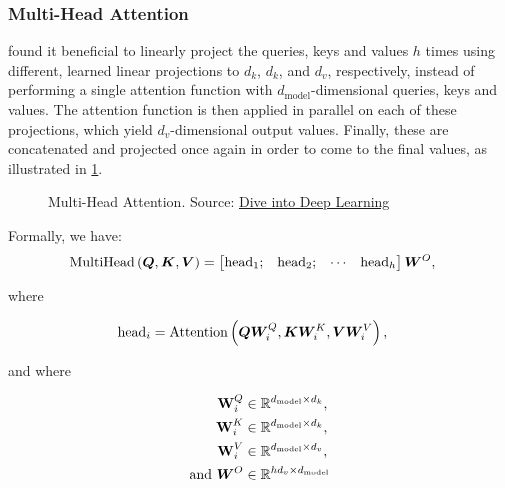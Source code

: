 \subsubsection{Multi-Head Attention}
\label{subsubsec:multi_head_attention}

\citet{vaswani2017attention} found it beneficial to linearly project the queries, keys and values $h$ times using different, learned linear projections to $d_k$, $d_k$, and $d_v$, respectively, instead of performing a single attention function with $d_{\text{model}}$-dimensional queries, keys and values. The attention function is then applied in parallel on each of these projections, which yield $d_v$-dimensional output values. Finally, these are concatenated and projected once again in order to come to the final values, as illustrated in \cref{fig:multi-head_attention}.

\begin{figure}[ht!]
    \centering
    \def\svgscale{0.8}
    
    \caption[Multi-Head Attention]{Multi-Head Attention. Source: \href{https://d2l.ai/chapter_attention-mechanisms/multihead-attention.html}{Dive into Deep Learning}}
    \label{fig:multi-head_attention}
\end{figure}

Formally, we have:
\begin{align}
    \text{MultiHead}\left( \vect{Q}, \vect{K}, \vect{V} \right) &= \begin{bmatrix}\text{head}_1; & \text{head}_2; & \cdots & \text{head}_h\end{bmatrix} \Wvect^O,
\end{align}

where

\begin{align}
    \text{head}_i &= \text{Attention}\left( \vect{Q} \Wvect_i^Q, \vect{K} \Wvect_i^K, \vect{V} \Wvect_i^V \right),
\end{align}

and where

\begin{align*}
    \Wvect_i^Q &\in \reals{d_{\text{model}} \times d_k}, \\
    \Wvect_i^K  &\in \reals{d_{\text{model}} \times d_k}, \\
    \Wvect_i^V  &\in \reals{d_{\text{model}} \times d_v}, \\
    \text{and } \Wvect^O &\in \reals{h d_v \times d_{\text{model}}}
\end{align*}

